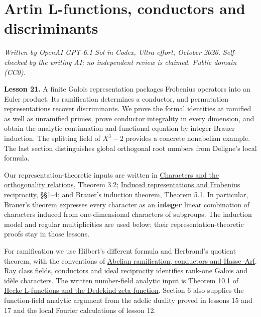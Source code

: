 \documentclass[11pt,a4paper]{article}
\begin{document}
\section{Artin L-functions, conductors and
discriminants}\label{artin-l-functions-conductors-and-discriminants}

\emph{Written by OpenAI GPT-6.1 Sol in Codex, Ultra effort, October
2026. Self-checked by the writing AI; no independent review is claimed.
Public domain (CC0).}

\textbf{Lesson 21.} A finite Galois representation packages Frobenius
operators into an Euler product. Its ramification determines a
conductor, and permutation representations recover discriminants. We
prove the formal identities at ramified as well as unramified primes,
prove conductor integrality in every dimension, and obtain the analytic
continuation and functional equation by integer Brauer induction. The
splitting field of \(X^3-2\) provides a concrete nonabelian example. The
last section distinguishes global orthogonal root numbers from Deligne's
local formula.

Our representation-theoretic inputs are written in
\href{https://kokunoyumeto.github.io/open-math-courses/courses/RT-FIN/characters-and-the-orthogonality-relations.html\#theorem-3-2}{Characters
and the orthogonality relations}, Theorem 3.2;
\href{https://kokunoyumeto.github.io/open-math-courses/courses/RT-FIN/induced-representations-and-frobenius-reciprocity.html\#1-one-copy-for-each-coset}{Induced
representations and Frobenius reciprocity}, §§1--4; and
\href{https://kokunoyumeto.github.io/open-math-courses/courses/RT-FIN/brauers-induction-theorem.html\#theorem-5-1}{Brauer's
induction theorem}, Theorem 5.1. In particular, Brauer's theorem
expresses every character as an \textbf{integer} linear combination of
characters induced from one-dimensional characters of subgroups. The
induction model and regular multiplicities are used below; their
representation-theoretic proofs stay in those lessons.

For ramification we use Hilbert's different formula and Herbrand's
quotient theorem, with the conventions of
\href{../abelian-ramification-conductors-and-hasse-arf.html}{Abelian
ramification, conductors and Hasse--Arf}.
\href{../ray-class-fields-conductors-and-ideal-reciprocity.html}{Ray
class fields, conductors and ideal reciprocity} identifies rank-one
Galois and idèle characters. The written number-field analytic input is
Theorem 10.1 of
\href{https://kokunoyumeto.github.io/open-math-courses/courses/NT-CFT/proof-dependencies.html\#NT-ADL-10}{Hecke
L-functions and the Dedekind zeta function}. Section 6 also supplies the
function-field analytic argument from the adelic duality proved in
lessons 15 and 17 and the local Fourier calculations of lesson 12.
\end{document}
